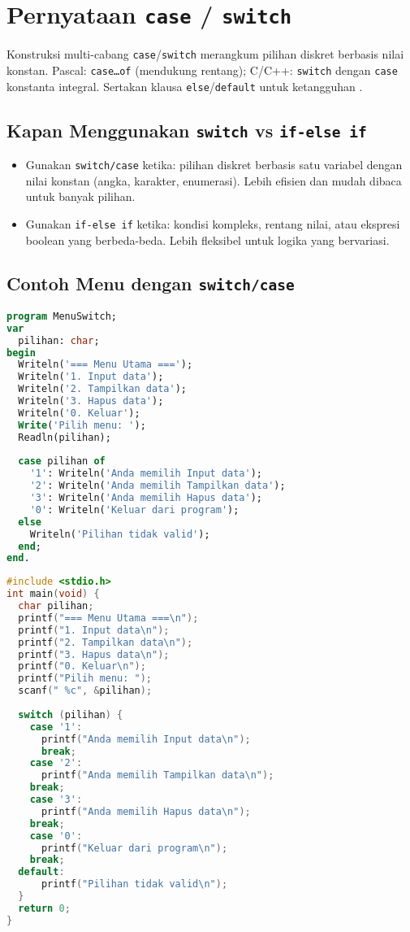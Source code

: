 \documentclass[../main.tex]{subfiles}
\begin{document}
\section{Pernyataan \texttt{case} / \texttt{switch}}
Konstruksi multi-cabang \texttt{case}/\texttt{switch} merangkum pilihan diskret berbasis nilai konstan. Pascal: \texttt{case\ldots of} (mendukung rentang); C/C++: \texttt{switch} dengan \texttt{case} konstanta integral. Sertakan klausa \texttt{else}/\texttt{default} untuk ketangguhan \parencite{pascal-tutorial-wikibooks,gnu-c-manual,cpp-reference,cpp-switch,cpp-enum-class}.

\subsection{Kapan Menggunakan \texttt{switch} vs \texttt{if-else if}}
\begin{itemize}
  \item Gunakan \texttt{switch/case} ketika: pilihan diskret berbasis satu variabel dengan nilai konstan (angka, karakter, enumerasi). Lebih efisien dan mudah dibaca untuk banyak pilihan.
  \item Gunakan \texttt{if-else if} ketika: kondisi kompleks, rentang nilai, atau ekspresi boolean yang berbeda-beda. Lebih fleksibel untuk logika yang bervariasi.
\end{itemize}

\subsection{Contoh Menu dengan \texttt{switch/case}}
\begin{lstlisting}[language=Pascal, caption={Menu dengan case di Pascal}]
program MenuSwitch;
var
  pilihan: char;
begin
  Writeln('=== Menu Utama ===');
  Writeln('1. Input data');
  Writeln('2. Tampilkan data');
  Writeln('3. Hapus data');
  Writeln('0. Keluar');
  Write('Pilih menu: ');
  Readln(pilihan);
  
  case pilihan of
    '1': Writeln('Anda memilih Input data');
    '2': Writeln('Anda memilih Tampilkan data');
    '3': Writeln('Anda memilih Hapus data');
    '0': Writeln('Keluar dari program');
  else
    Writeln('Pilihan tidak valid');
  end;
end.
\end{lstlisting}

\begin{lstlisting}[language=C, caption={Menu dengan switch di C}]
#include <stdio.h>
int main(void) {
  char pilihan;
  printf("=== Menu Utama ===\n");
  printf("1. Input data\n");
  printf("2. Tampilkan data\n");
  printf("3. Hapus data\n");
  printf("0. Keluar\n");
  printf("Pilih menu: ");
  scanf(" %c", &pilihan);
  
  switch (pilihan) {
    case '1':
      printf("Anda memilih Input data\n");
      break;
    case '2':
      printf("Anda memilih Tampilkan data\n");
    break;
    case '3':
      printf("Anda memilih Hapus data\n");
    break;
    case '0':
      printf("Keluar dari program\n");
    break;
  default:
      printf("Pilihan tidak valid\n");
  }
  return 0;
}
\end{lstlisting}
\end{document}

